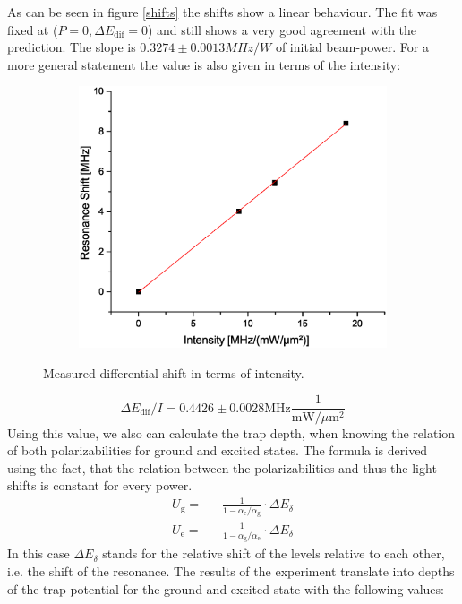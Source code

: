 As can be seen in figure \ref{shifts} the shifts show a linear behaviour. The fit was fixed at ($P=0, \Delta E_\mathrm{dif}=0$) and still shows a very good  agreement with the prediction. The slope is $0.3274\pm 0.0013\unit{MHz/W}$ of initial beam-power. For a more general statement the value is also given in terms of the intensity:
\begin{figure}[h]
\centering
\begin{subfigure}[b]{0.8\textwidth}
                \includegraphics[width=\textwidth]{shiftintens}
\end{subfigure}
\caption{Measured differential shift in terms of intensity.}
\label{shiftintens}
\end{figure}
\begin{equation}
\Delta E_\mathrm{dif}/I=0.4426\pm 0.0028\mathrm{MHz}\frac{1}{\mathrm{mW}/\mu \mathrm{m}^2}
\end{equation}
Using this value, we also can calculate the trap depth, when knowing the relation of both polarizabilities for ground and excited states. The formula is derived using the fact, that the relation between the polarizabilities and thus the light shifts is constant for every power.
\begin{align}
U_{\mathrm{g}}=&-\frac{1}{1-\alpha_{\mathrm{e}}/\alpha_{\mathrm{g}}}\cdot \Delta E_\delta\\
U_{\mathrm{e}}=&-\frac{1}{1-\alpha_{\mathrm{g}}/\alpha_{\mathrm{e}}}\cdot \Delta E_\delta
\end{align}
In this case $\Delta E_\delta$ stands for the relative shift of the levels relative to each other, i.e. the shift of the resonance. The results of the experiment translate into depths of the trap potential for the ground and excited state with the following values:
